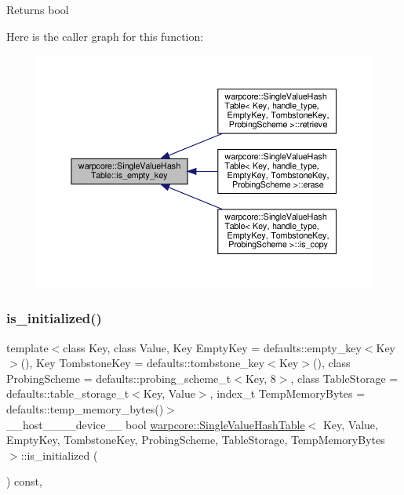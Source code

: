 \begin{DoxyReturn}{Returns}
{\ttfamily bool} 
\end{DoxyReturn}
Here is the caller graph for this function\+:
\nopagebreak
\begin{figure}[H]
\begin{center}
\leavevmode
\includegraphics[width=350pt]{classwarpcore_1_1SingleValueHashTable_a804597a01cdfb417ca451760a9452542_icgraph}
\end{center}
\end{figure}
\mbox{\label{classwarpcore_1_1SingleValueHashTable_ae366b3fd0d7edbac68a939fe580df9a4}} 
\subsubsection{\texorpdfstring{is\+\_\+initialized()}{is\_initialized()}}
{\footnotesize\ttfamily template$<$class Key, class Value, Key Empty\+Key = defaults\+::empty\+\_\+key$<$\+Key$>$(), Key Tombstone\+Key = defaults\+::tombstone\+\_\+key$<$\+Key$>$(), class Probing\+Scheme = defaults\+::probing\+\_\+scheme\+\_\+t$<$\+Key, 8$>$, class Table\+Storage = defaults\+::table\+\_\+storage\+\_\+t$<$\+Key, Value$>$, index\+\_\+t Temp\+Memory\+Bytes = defaults\+::temp\+\_\+memory\+\_\+bytes()$>$ \\
\+\_\+\+\_\+host\+\_\+\+\_\+\+\_\+\+\_\+device\+\_\+\+\_\+ bool \hyperlink{classwarpcore_1_1SingleValueHashTable}{warpcore\+::\+Single\+Value\+Hash\+Table}$<$ Key, Value, Empty\+Key, Tombstone\+Key, Probing\+Scheme, Table\+Storage, Temp\+Memory\+Bytes $>$\+::is\+\_\+initialized (\begin{DoxyParamCaption}{ }\end{DoxyParamCaption}) const\hspace{0.3cm}{\ttfamily [inline]}, {\ttfamily [noexcept]}}



